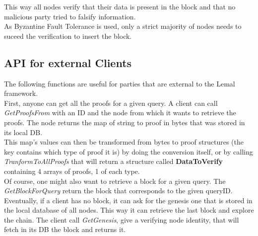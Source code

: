 \documentclass{article}
\begin{document}
This way all nodes verify that their data is present in the block and that no malicious party tried to falsify information.\\
As Byzantine Fault Tolerance is used, only a strict majority of nodes needs to suceed the verification to insert the block.\\

\subsection{API for external Clients}
The following functions are useful for parties that are external to the Lemal framework.\\
First, anyone can get all the proofs for a given query. A client can call \textit{GetProofsFrom} with an ID and the node from which it wants to retrieve the proofs. The node returns the map of string to proof in bytes that was stored in its local DB.\\
This map's values can then be transformed from bytes to proof structures (the key contains which type of proof it is) by doing the conversion itself, or by calling \textit{TranformToAllProofs} that will return a structure called \textbf{DataToVerify} containing 4 arrays of proofs, 1 of each type.\\

Of course, one might also want to retrieve a block for a given query. The \textit{GetBlockForQuery} return the block that corresponds to the given queryID.\\

Eventually, if a client has no block, it can ask for the genesis one that is stored in the local database of all nodes. This way it can retrieve the last block and explore the chain. The client call \textit{GetGenesis}, give a verifying node identity, that will fetch in its DB the block and returns it.
\end{document}
